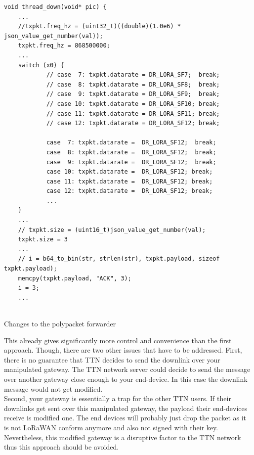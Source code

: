 \begin{listing}[h]
    \begin{verbatim}
void thread_down(void* pic) {
    ...
    //txpkt.freq_hz = (uint32_t)((double)(1.0e6) * json_value_get_number(val));
    txpkt.freq_hz = 868500000;
    ...
    switch (x0) {
            // case  7: txpkt.datarate = DR_LORA_SF7;  break;
            // case  8: txpkt.datarate = DR_LORA_SF8;  break;
            // case  9: txpkt.datarate = DR_LORA_SF9;  break;
            // case 10: txpkt.datarate = DR_LORA_SF10; break;
            // case 11: txpkt.datarate = DR_LORA_SF11; break;
            // case 12: txpkt.datarate = DR_LORA_SF12; break;
            
            case  7: txpkt.datarate =  DR_LORA_SF12;  break;
            case  8: txpkt.datarate =  DR_LORA_SF12;  break;
            case  9: txpkt.datarate =  DR_LORA_SF12;  break;
            case 10: txpkt.datarate =  DR_LORA_SF12; break;
            case 11: txpkt.datarate =  DR_LORA_SF12; break;
            case 12: txpkt.datarate =  DR_LORA_SF12; break;
            ... 
    }
    ...
    // txpkt.size = (uint16_t)json_value_get_number(val);
    txpkt.size = 3
    ... 
    // i = b64_to_bin(str, strlen(str), txpkt.payload, sizeof txpkt.payload);
    memcpy(txpkt.payload, "ACK", 3);
    i = 3;
    ...
           

        \end{verbatim}
        \caption{Changes to the polypacket forwarder}
        \label{lst:polypkt}
\end{listing}

This already gives significantly more control and convenience than the first approach. Though, there are two other issues that have to be addressed.
First, there is no guarantee that TTN decides to send the downlink over your manipulated gateway. The TTN network server could decide to send the message over another gateway close enough to
your end-device. In this case the downlink message would not get modified.
\\
Second, your gateway is essentially a trap for the other TTN users. If their downlinks get sent over this manipulated gateway, 
the payload their end-devices receive is modified one. The end devices will probably just drop the packet as 
it is not LoRaWAN conform anymore and also not signed with their key. Nevertheless, this modified gateway is a disruptive factor 
to the TTN network thus this approach should be avoided.




